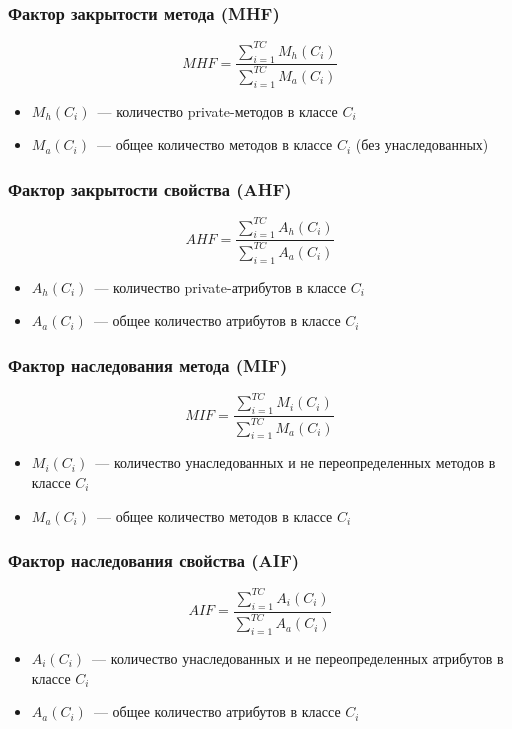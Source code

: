 \documentclass{../../slides-style}
\begin{document}
    \begin{frame}
        \frametitle{Фактор закрытости метода (MHF)}
        $$MHF = \frac{\sum\limits_{i=1}^{TC}M_h(C_i)}{\sum\limits_{i=1}^{TC}M_a(C_i)}$$
        \begin{itemize}
            \item $M_h(C_i)$~--- количество private-методов в классе $C_i$
            \item $M_a(C_i)$~--- общее количество методов в классе $C_i$ (без унаследованных)
        \end{itemize}
    \end{frame}

    \begin{frame}
        \frametitle{Фактор закрытости свойства (AHF)}
        $$AHF = \frac{\sum\limits_{i=1}^{TC}A_h(C_i)}{\sum\limits_{i=1}^{TC}A_a(C_i)}$$
        \begin{itemize}
            \item $A_h(C_i)$~--- количество private-атрибутов в классе $C_i$
            \item $A_a(C_i)$~--- общее количество атрибутов в классе $C_i$
        \end{itemize}
    \end{frame}

    \begin{frame}
        \frametitle{Фактор наследования метода (MIF)}
        $$MIF = \frac{\sum\limits_{i=1}^{TC}M_i(C_i)}{\sum\limits_{i=1}^{TC}M_a(C_i)}$$
        \begin{itemize}
            \item $M_i(C_i)$~--- количество унаследованных и не переопределенных методов в классе $C_i$
            \item $M_a(C_i)$~--- общее количество методов в классе $C_i$
        \end{itemize}
    \end{frame}

    \begin{frame}
        \frametitle{Фактор наследования свойства (AIF)}
        $$AIF = \frac{\sum\limits_{i=1}^{TC}A_i(C_i)}{\sum\limits_{i=1}^{TC}A_a(C_i)}$$
        \begin{itemize}
            \item $A_i(C_i)$~--- количество унаследованных и не переопределенных атрибутов в классе $C_i$
            \item $A_a(C_i)$~--- общее количество атрибутов в классе $C_i$
        \end{itemize}
    \end{frame}
\end{document}
